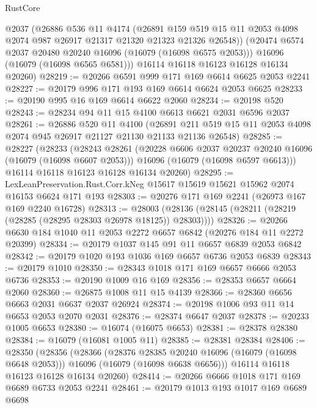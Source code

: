 \begin{lexlean}{RustCore}
\begin{coremodule}
        @2037
        (@26886
          @536
          @11
          @4174
          (@26891
            @159
            @519
            @15
            @11
            @2053
            @4098
            @2074
            @987
            @26917
            @21317
            @21320
            @21323
            @21326
            @26548))
        (@20474 @6574 @2037 @20480 @20240 @16096 (@16079 (@16098 @6575 @2053)))
        @16096
        (@16079 (@16098 @6565 @6581)))
      @16114
      @16118
      @16123
      @16128
      @16134
      @20260)
@28219 := @20266 @6591 @999 @171 @169 @6614 @6625 @2053 @2241
@28227 := @20179 @996 @171 @193 @169 @6614 @6624 @2053 @6625
@28233 := @20190 @995 @16 @169 @6614 @6622 @2060
@28234 := @20198 @520
@28243 := @28234 @94 @11 @15 @4100 @6613 @6621 @2031 @6596 @2037
@28261 := @26886
    @520
    @11
    @4100
    (@26891 @211 @519 @15 @11 @2053 @4098 @2074 @945 @26917 @21127 @21130 @21133 @21136 @26548)
@28285 := @28227
    (@28233
      (@28243
        @28261
        (@20228 @6606 @2037 @20237 @20240 @16096 (@16079 (@16098 @6607 @2053)))
        @16096
        (@16079 (@16098 @6597 @6613)))
      @16114
      @16118
      @16123
      @16128
      @16134
      @20260)
@28295 := LexLeanPreservation.Rust.Corr.kNeg
    @15617
    @15619
    @15621
    @15962
    @2074
    @16153
    @6624
    @171
    @193
@28303 := @20276 @171 @169 @2241 (@26973 @167 @169 @2240 @16728)
@28313 := @28003 (@28136 (@28145 (@28211 (@28219 (@28285 (@28295 @28303 @26978 @18125)) @28303))))
@28326 := @20266 @6630 @184 @1040 @11 @2053 @2272 @6657 @6842 (@20276 @184 @11 @2272 @20399)
@28334 := @20179 @1037 @145 @91 @11 @6657 @6839 @2053 @6842
@28342 := @20179 @1020 @193 @1036 @169 @6657 @6736 @2053 @6839
@28343 := @20179 @1010
@28350 := @28343 @1018 @171 @169 @6657 @6666 @2053 @6736
@28353 := @20190 @1009 @16 @169
@28356 := @28353 @6657 @6664 @2060
@28360 := @26875 @1008 @11 @15 @4139
@28366 := @28360 @6656 @6663 @2031 @6637 @2037 @26924
@28374 := @20198 @1006 @93 @11 @14 @6653 @2053 @2070 @2031
@28376 := @28374 @6647 @2037
@28378 := @20233 @1005 @6653
@28380 := @16074 (@16075 @6653)
@28381 := @28378 @28380
@28384 := @16079 (@16081 @1005 @11)
@28385 := @28381 @28384
@28406 := @28350
    (@28356
      (@28366
        (@28376 @28385 @20240 @16096 (@16079 (@16098 @6648 @2053)))
        @16096
        (@16079 (@16098 @6638 @6656)))
      @16114
      @16118
      @16123
      @16128
      @16134
      @20260)
@28414 := @20266 @6666 @1018 @171 @169 @6689 @6733 @2053 @2241
@28461 := @20179
    @1013
    @193
    @1017
    @169
    @6689
    @6698

\end{coremodule}
\end{lexlean}
